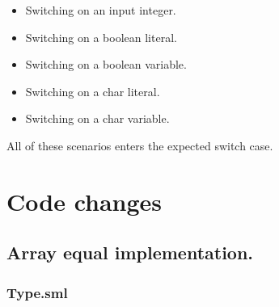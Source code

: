 \documentclass[12pt]{article}
\begin{document}
\begin{itemize}
    \item Switching on an input integer. 
    \item Switching on a boolean literal.
    \item Switching on a boolean variable.
    \item Switching on a char literal.
    \item Switching on a char variable.
\end{itemize}

\noindent All of these scenarios enters the expected switch case.

\pagebreak

\appendix

\section{Code changes}

\subsection{Array equal implementation.}

\subsubsection{Type.sml}
\end{document}
